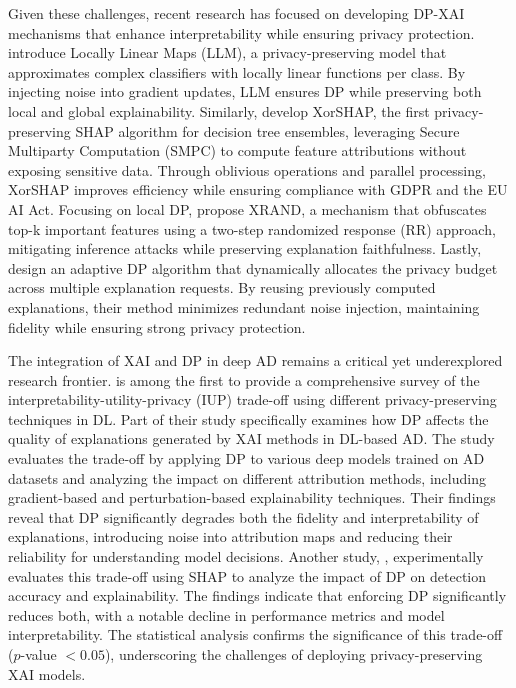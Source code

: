 Given these challenges, recent research has focused on developing DP-XAI mechanisms that enhance interpretability while ensuring privacy protection. \cite{harder2020interpretable} introduce Locally Linear Maps (LLM), a privacy-preserving model that approximates complex classifiers with locally linear functions per class. By injecting noise into gradient updates, LLM ensures DP while preserving both local and global explainability. Similarly, \cite{jetchev2023xorshap} develop XorSHAP, the first privacy-preserving SHAP algorithm for decision tree ensembles, leveraging Secure Multiparty Computation (SMPC) to compute feature attributions without exposing sensitive data. Through oblivious operations and parallel processing, XorSHAP improves efficiency while ensuring compliance with GDPR and the EU AI Act. Focusing on local DP, \cite{nguyen2023xrand} propose XRAND, a mechanism that obfuscates top-k important features using a two-step randomized response (RR) approach, mitigating inference attacks while preserving explanation faithfulness. Lastly, \cite{patel2022model} design an adaptive DP algorithm that dynamically allocates the privacy budget across multiple explanation requests. By reusing previously computed explanations, their method minimizes redundant noise injection, maintaining fidelity while ensuring strong privacy protection.

The integration of XAI and DP in deep AD remains a critical yet underexplored research frontier. \cite{saifullah2022privacy} is among the first to provide a comprehensive survey of the interpretability-utility-privacy (IUP) trade-off using different privacy-preserving techniques in DL. Part of their study specifically examines how DP affects the quality of explanations generated by XAI methods in DL-based AD. The study evaluates the trade-off by applying DP to various deep models trained on AD datasets and analyzing the impact on different attribution methods, including gradient-based and perturbation-based explainability techniques. Their findings reveal that DP significantly degrades both the fidelity and interpretability of explanations, introducing noise into attribution maps and reducing their reliability for understanding model decisions. Another study, \cite{ezzeddine2024differential}, experimentally evaluates this trade-off using SHAP to analyze the impact of DP on detection accuracy and explainability. The findings indicate that enforcing DP significantly reduces both, with a notable decline in performance metrics and model interpretability. The statistical analysis confirms the significance of this trade-off ($p$-value $< 0.05$), underscoring the challenges of deploying privacy-preserving XAI models.

